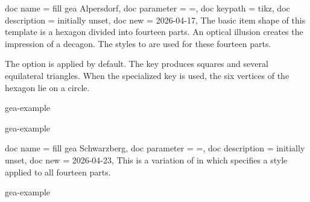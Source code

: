 \documentclass[a4paper,11pt]{article}
\begin{document}
\clearpage
\begin{docKeys}
  {
    {
      doc name        = fill gea Alpersdorf,
      doc parameter   = {=},
      doc keypath     = tikz,
      doc description = {initially unset},
      doc new         = 2026-04-17,
    }
  }
  The basic item shape of this template is a hexagon divided into fourteen parts.
  An optical illusion creates the impression of a decagon.
  The styles  to  are used for these fourteen parts.

  The option  is applied by default. The key
   produces squares and several equilateral
  triangles. When the specialized key
   is used,
  the six vertices of the hexagon lie on a circle.

\begin{dispExample*}{gea-example}
\end{dispExample*}

\begin{dispExample*}{gea-example}
\end{dispExample*}

\end{docKeys}



\begin{docTikzKeys}
  {
    {
      doc name        = fill gea Schwarzberg,
      doc parameter   = {=},
      doc description = {initially unset},
      doc new         = 2026-04-23,
    }
  }
  This is a variation of  in which
  specifies a style applied to all fourteen parts.
\begin{dispExample*}{gea-example}
\end{dispExample*}
\end{docTikzKeys}
\end{document}

